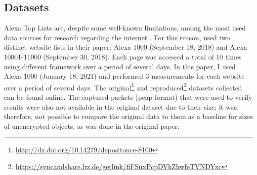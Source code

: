 \subsection{Datasets}
Alexa Top Lists are, despite some well-known limitations, among the most used data sources for research regarding the internet \cite{10.1145/3278532.3278574}. For this reason, \citeauthor{10.1007/978-3-030-15986-3_19}  used two distinct website lists in their paper: Alexa 1000 (September 18, 2018) and Alexa 10001-11000 (September 30, 2018). Each page was accessed a total of 10 times using different framework over a period of several days. In this paper, I used Alexa 1000 (January 18, 2021) and performed 3 measurements for each website over a period of several days. The original\footnote{\url{http://dx.doi.org/10.14279/depositonce-8100}} and reproduced\footnote{\url{https://syncandshare.lrz.de/getlink/fiFSuxPcpDVkZhwfeTVNDYxc}} datasets collected can be found online. The captured packets (pcap format) that were used to verify results were also not available in the original dataset due to their size; it was, therefore, not possible to compare the original data to them as a baseline for sizes of unencrypted objects, as was done in the original paper. 
